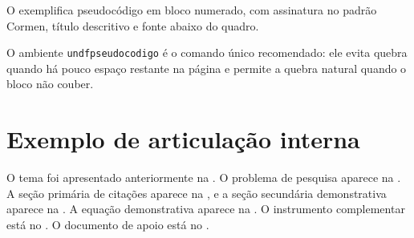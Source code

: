O  exemplifica pseudocódigo em bloco numerado, com assinatura no padrão Cormen, título descritivo e fonte abaixo do quadro.

O ambiente \verb|undfpseudocodigo| é o comando único recomendado: ele evita quebra quando há pouco espaço restante na página e permite a quebra natural quando o bloco não couber.

\section{Exemplo de articulação interna}

O tema foi apresentado anteriormente na . O problema de pesquisa aparece na . A seção primária de citações aparece na , e a seção secundária demonstrativa aparece na . A equação demonstrativa aparece na . O instrumento complementar está no . O documento de apoio está no .
